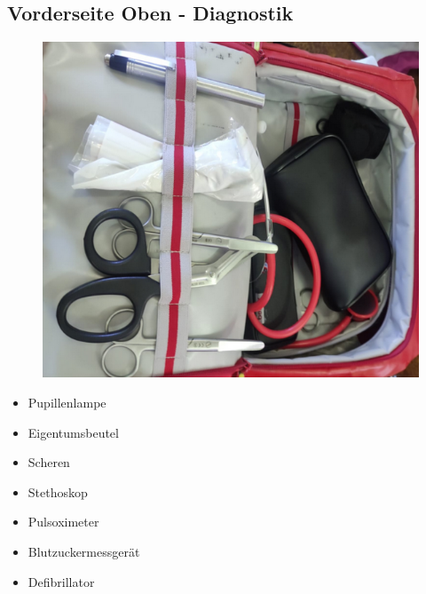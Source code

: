 \subsection*{Vorderseite Oben - Diagnostik}
\begin{figure}[H]
    \centering
    \includegraphics[scale=.5]{res/rucksack_vorne_oben.png}
\end{figure}
\begin{itemize}
   \item Pupillenlampe
   \item Eigentumsbeutel
   \item Scheren
   \item Stethoskop
   \item Pulsoximeter 
   \item Blutzuckermessgerät
   \item Defibrillator 
\end{itemize}

